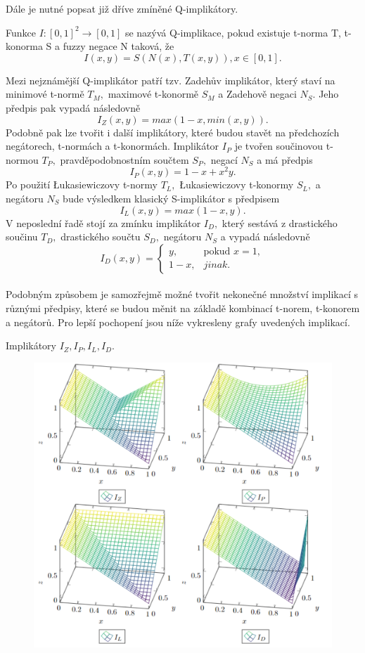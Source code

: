 Dále je nutné popsat již dříve zmíněné Q-implikátory.
\begin{definition}
    \cite{Springer}
    Funkce $I: [0,1]^2 \rightarrow [0,1]$ se nazývá Q-implikace, pokud existuje t-norma T, t-konorma S a fuzzy negace N taková, že $$I(x,y) = S(N(x),T(x,y)), x \in [0,1].$$
\end{definition}
Mezi nejznámější Q-implikátor patří tzv. Zadeh\r uv implikátor, který staví na minimové t-normě $T_M,$ maximové t-konormě $S_M$ a Zadehově negaci $N_S$. Jeho předpis pak vypadá následovně $$I_Z(x,y) = max(1-x, min(x,y)).$$ Podobně pak lze tvořit i další implikátory, které budou stavět na předchozích negátorech, t-normách a t-konormách. Implikátor $I_P$ je tvořen součinovou t-normou $T_P,$ pravděpodobnostním součtem $S_P,$ negací $N_S$ a má předpis $$I_P(x,y) = 1-x+x^2y.$$  Po použití Łukasiewiczovy t-normy $T_L,$ Łukasiewiczovy t-konormy $S_L,$ a negátoru $N_S$ bude výsledkem klasický S-implikátor s předpisem $$I_L(x,y) = max(1-x, y).$$ V neposlední řadě stojí za zmínku implikátor $I_D,$ který sestává z drastického součinu $T_D,$ drastického součtu $S_D,$ negátoru $N_S$ a vypadá následovně $$I_D(x,y) = \begin{cases}  y, & \mbox{pokud } x = 1,\\
                1 - x, &  jinak.  \end{cases}$$\\ 
Podobným zp\r usobem je samozřejmě možné tvořit nekonečné množství implikací s r\r uznými předpisy, které se budou měnit na základě kombinací t-norem, t-konorem a negátor\r u. Pro lepší pochopení jsou níže vykresleny grafy uvedených implikací.
\begin{graph}Implikátory $I_Z, I_P, I_L, I_D.$
\begin{figure}[H]
                \hspace{-1cm}
                \includegraphics[scale=0.5]{template-fig/impl3.pdf}
                \centering
            \end{figure}
    
\end{graph}

